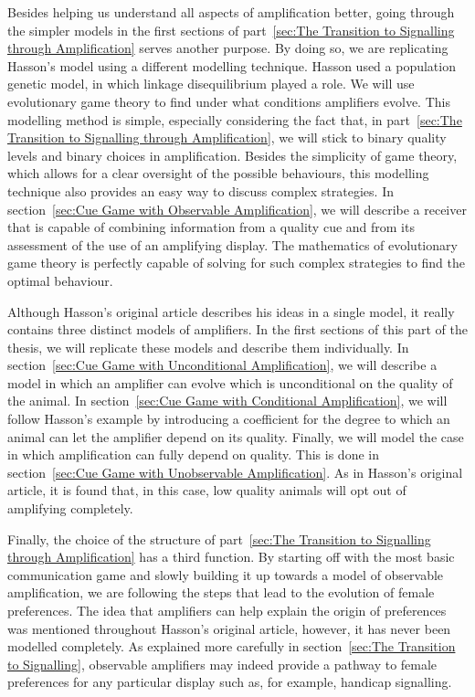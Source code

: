 \documentclass[a4paper,12pt]{article}
\numberwithin{equation}{section}
\begin{document}
Besides helping us understand all aspects of amplification better, going through the simpler models in the first sections of part~\ref{sec:The Transition to Signalling through Amplification} serves another purpose. By doing so, we are replicating Hasson's model using a different modelling technique. Hasson used a population genetic model, in which linkage disequilibrium played a role. We will use evolutionary game theory to find under what conditions amplifiers evolve. This modelling method is simple, especially considering the fact that, in part~\ref{sec:The Transition to Signalling through Amplification}, we will stick to binary quality levels and binary choices in amplification. Besides the simplicity of game theory, which allows for a clear oversight of the possible behaviours, this modelling technique also provides an easy way to discuss complex strategies. In section~\ref{sec:Cue Game with Observable Amplification}, we will describe a receiver that is capable of combining information from a quality cue and from its assessment of the use of an amplifying display. The mathematics of evolutionary game theory is perfectly capable of solving for such complex strategies to find the optimal behaviour.

Although Hasson's original article describes his ideas in a single model, it really contains three distinct models of amplifiers. In the first sections of this part of the thesis, we will replicate these models and describe them individually. In section~\ref{sec:Cue Game with Unconditional Amplification}, we will describe a model in which an amplifier can evolve which is unconditional on the quality of the animal. In section~\ref{sec:Cue Game with Conditional Amplification}, we will follow Hasson's example by introducing a coefficient for the degree to which an animal can let the amplifier depend on its quality. Finally, we will model the case in which amplification can fully depend on quality. This is done in section~\ref{sec:Cue Game with Unobservable Amplification}. As in Hasson's original article, it is found that, in this case, low quality animals will opt out of amplifying completely.

\newpage

Finally, the choice of the structure of part~\ref{sec:The Transition to Signalling through Amplification} has a third function. By starting off with the most basic communication game and slowly building it up towards a model of observable amplification, we are following the steps that lead to the evolution of female preferences. The idea that amplifiers can help explain the origin of preferences was mentioned throughout Hasson's original article, however, it has never been modelled completely. As explained more carefully in section~\ref{sec:The Transition to Signalling}, observable amplifiers may indeed provide a pathway to female preferences for any particular display such as, for example, handicap signalling.
\end{document}
